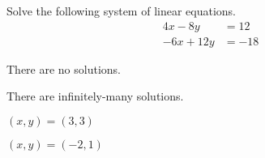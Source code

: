 \documentclass{article}
\begin{document}
\begin{readinessAssuranceTest}
\item Solve the following system of linear equations.
      \begin{align*}
      4x-8y   &= 12 \\
      -6x+12y  &=  -18
      \end{align*}

\begin{multicols}{4}
\begin{readinessAssuranceTestChoices}
\item There are no solutions.
\item There are infinitely-many solutions. %
\item
\((x,y)=(3,3)\)
\item
\((x,y)=(-2,1)\)
\end{readinessAssuranceTestChoices}
\end{multicols}

\end{readinessAssuranceTest}
\end{document}
